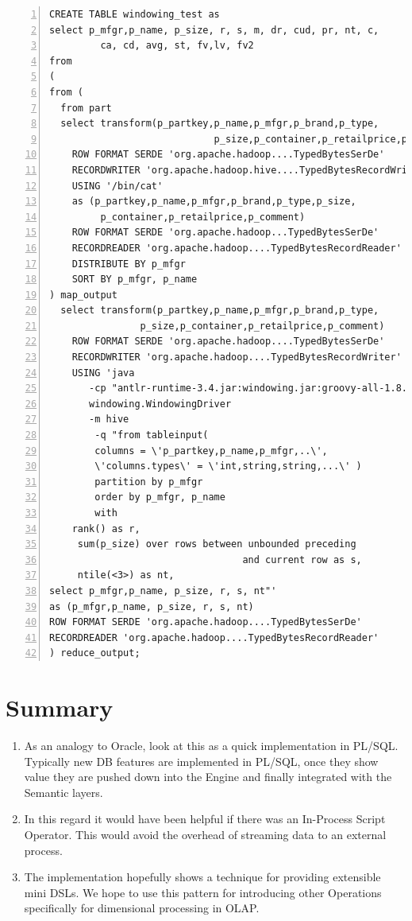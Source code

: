 \documentclass[pdftex,10pt,a4paper]{article}
\begin{document}
{\small
   \lstset{keywordstyle=\bfseries\underbar, emphstyle=\underbar,
     language=SQL, showspaces=false, showstringspaces=false}
   \begin{lstlisting}[caption={A complete Query in Hive Mode},frame=shadowbox, numbers=left]
CREATE TABLE windowing_test as
select p_mfgr,p_name, p_size, r, s, m, dr, cud, pr, nt, c, 
         ca, cd, avg, st, fv,lv, fv2
from
(
from (
  from part
  select transform(p_partkey,p_name,p_mfgr,p_brand,p_type,
                             p_size,p_container,p_retailprice,p_comment)
    ROW FORMAT SERDE 'org.apache.hadoop....TypedBytesSerDe'
    RECORDWRITER 'org.apache.hadoop.hive....TypedBytesRecordWriter'
    USING '/bin/cat'
    as (p_partkey,p_name,p_mfgr,p_brand,p_type,p_size,
         p_container,p_retailprice,p_comment)
    ROW FORMAT SERDE 'org.apache.hadoop...TypedBytesSerDe'
    RECORDREADER 'org.apache.hadoop....TypedBytesRecordReader'
    DISTRIBUTE BY p_mfgr
    SORT BY p_mfgr, p_name
) map_output
  select transform(p_partkey,p_name,p_mfgr,p_brand,p_type,
                p_size,p_container,p_retailprice,p_comment)
    ROW FORMAT SERDE 'org.apache.hadoop....TypedBytesSerDe'
    RECORDWRITER 'org.apache.hadoop....TypedBytesRecordWriter'
    USING 'java 
       -cp "antlr-runtime-3.4.jar:windowing.jar:groovy-all-1.8.0.jar...." 
       windowing.WindowingDriver 
       -m hive 
        -q "from tableinput(
        columns = \'p_partkey,p_name,p_mfgr,..\', 
        \'columns.types\' = \'int,string,string,...\' ) 
        partition by p_mfgr 
        order by p_mfgr, p_name 
        with
  	rank() as r,
 	 sum(p_size) over rows between unbounded preceding 
 	                              and current row as s,
 	 ntile(<3>) as nt,
select p_mfgr,p_name, p_size, r, s, nt"'
as (p_mfgr,p_name, p_size, r, s, nt)
ROW FORMAT SERDE 'org.apache.hadoop....TypedBytesSerDe'
RECORDREADER 'org.apache.hadoop....TypedBytesRecordReader'
) reduce_output;
   \end{lstlisting}
   }


\section{Summary}
\begin{enumerate}
\item As an analogy to Oracle, look at this as a quick implementation in PL/SQL. Typically new DB features are implemented in PL/SQL, once they show value they are pushed down into the Engine and finally integrated with the Semantic layers.
\item In this regard it would have been helpful if there was an In-Process Script Operator. This would avoid the overhead of streaming data to an external process.
\item The implementation hopefully shows a technique for providing extensible mini DSLs. We hope to use this pattern for introducing other Operations specifically for dimensional processing in OLAP.
\end{enumerate}
\end{document}
